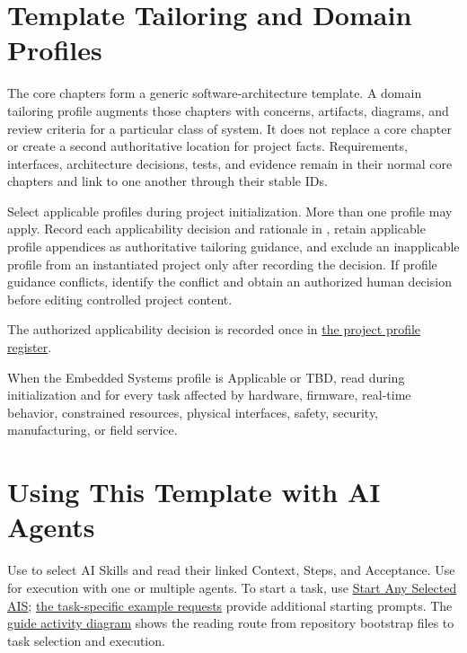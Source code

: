 \section{Template Tailoring and Domain Profiles}
\label{Section:DomainProfiles}
The core chapters form a generic software-architecture template. A domain
tailoring profile augments those chapters with concerns, artifacts, diagrams,
and review criteria for a particular class of system. It does not replace a
core chapter or create a second authoritative location for project facts.
Requirements, interfaces, architecture decisions, tests, and evidence remain
in their normal core chapters and link to one another through their stable IDs.

Select applicable profiles during project initialization. More than one
profile may apply. Record each applicability decision and rationale in
, retain applicable profile appendices as
authoritative tailoring guidance, and exclude an inapplicable profile from an
instantiated project only after recording the decision. If profile guidance
conflicts, identify the conflict and obtain an authorized human decision before
editing controlled project content.

The authorized applicability decision is recorded once in
\hyperref[Table:ProjectDomainProfiles]{the project profile register}.


When the Embedded Systems profile is Applicable or TBD, read
 during initialization and for every task
affected by hardware, firmware, real-time behavior, constrained resources,
physical interfaces, safety, security, manufacturing, or field service.

\section{Using This Template with AI Agents}
\label{Section:UsingTemplateAI}
Use  to select AI Skills and read their
linked Context, Steps, and Acceptance. Use
 for execution with one or multiple
agents. To start a task, use
\hyperref[Section:AIStartSelectedTaskPrompt]{Start Any Selected AIS};
\hyperref[Section:AIExamplePrompts]{the task-specific example requests}
provide additional starting prompts. The
\hyperref[Figure:AIGuideActivity]{guide activity diagram} shows the reading
route from repository bootstrap files to task selection and execution.


